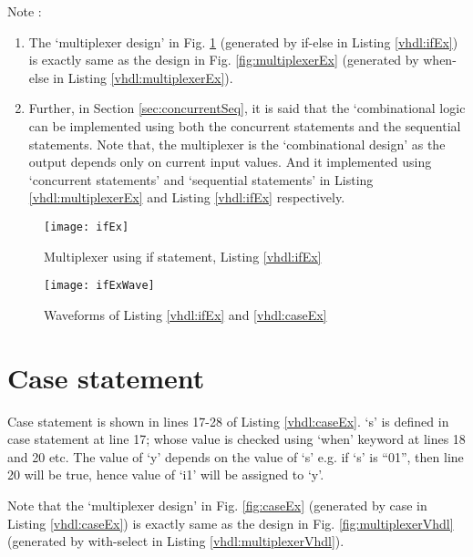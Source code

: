 \begin{noNumBox}
	Note : 
	\begin{enumerate}
		\item The `multiplexer design' in Fig. \ref{fig:ifEx} (generated by if-else in Listing \ref{vhdl:ifEx}) is exactly same as the design in Fig. \ref{fig:multiplexerEx} (generated by when-else in Listing \ref{vhdl:multiplexerEx}).  
		
		\item Further, in Section \ref{sec:concurrentSeq}, it is said that the `combinational logic can be implemented using both the concurrent statements and the sequential statements. Note that, the multiplexer is the `combinational design' as the output depends only on current input values. And it implemented using `concurrent statements' and `sequential statements' in Listing \ref{vhdl:multiplexerEx} and Listing \ref{vhdl:ifEx} respectively. 
	\end{enumerate}
\end{noNumBox}

\begin{figure}
	\centering
	\texttt{[image: ifEx]}
	\caption{Multiplexer using if statement, Listing \ref{vhdl:ifEx}}
	\label{fig:ifEx}
\end{figure}
\begin{figure}
	\centering
	\texttt{[image: ifExWave]}
	\caption{Waveforms of Listing \ref{vhdl:ifEx} and \ref{vhdl:caseEx}}
	\label{fig:ifExWave}
\end{figure}


\section{Case statement}
Case statement is shown in lines 17-28 of Listing \ref{vhdl:caseEx}. `s' is defined in case statement at line 17; whose value is checked using `when' keyword at lines 18 and 20 etc. The value of `y' depends on the value of `s' e.g. if `s' is ``01'', then line 20 will be true, hence value of `i1' will be assigned to `y'. 

\begin{noNumBox}
	Note that the `multiplexer design' in Fig. \ref{fig:caseEx} (generated by case in Listing \ref{vhdl:caseEx}) is exactly same as the design in Fig. \ref{fig:multiplexerVhdl} (generated by with-select in Listing \ref{vhdl:multiplexerVhdl}). 
\end{noNumBox}


